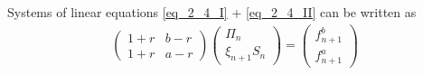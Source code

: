 \begin{*remark}
	Systems of linear equations  \eqref{eq_2_4_I} + \eqref{eq_2_4_II} can be written as
	\begin{align*}
		\begin{pmatrix}
			1+r & b-r \\
			1+r & a-r
		\end{pmatrix} 
		\begin{pmatrix}
			\Pi_n\\
			\xi_{n+1} S_n
		\end{pmatrix} = 
		\begin{pmatrix}
			f^b_{n+1}\\
			f^a_{n+1}
		\end{pmatrix} \tag{SLE-1}\label{eq_LGS_1}
	\end{align*}
\end{*remark}

